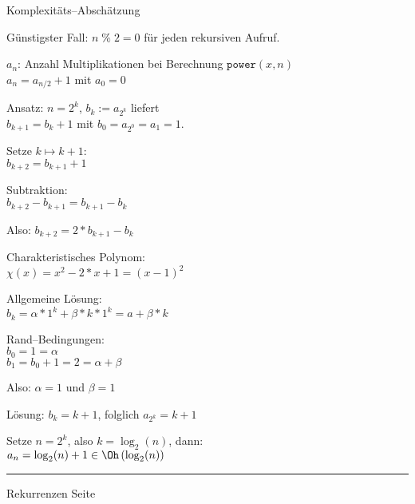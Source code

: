 
\begin{slide}{}
\normalsize

\begin{center}
Komplexit\"ats--Absch\"atzung
\end{center}
\vspace*{0.5cm}

\footnotesize
G\"unstigster Fall:  $n\;\%\;2 = 0$ f\"ur jeden rekursiven Aufruf.

$a_n$: Anzahl Multiplikationen bei Berechnung $\mathtt{power}(x,n)$ \\[0.3cm]
\hspace*{1.3cm} $a_n = a_{n/2} + 1$ \quad mit $a_0 = 0$
 
Ansatz: $n = 2^k$, $b_k := a_{2^k}$ liefert \\[0.3cm]
\hspace*{1.3cm} $b_{k+1} = b_k + 1$ \quad mit $b_0 = a_{2^0} = a_1 = 1$.

Setze $k \mapsto k + 1$: \\[0.3cm]
\hspace*{1.3cm} $b_{k+2} = b_{k+1} + 1$

Subtraktion: \\[0.3cm]
\hspace*{1.3cm} $b_{k+2} - b_{k+1} = b_{k+1} - b_k$ 

Also: $b_{k+2} = 2 * b_{k+1} - b_k$

Charakteristisches Polynom: \\[0.3cm]
\hspace*{1.3cm} $\chi(x) = x^2 - 2 * x + 1 = (x-1)^2$

Allgemeine L\"osung: \\[0.3cm]
\hspace*{1.3cm} $b_k = \alpha * 1^k + \beta * k * 1^k = a + \beta * k$

Rand--Bedingungen: \\[0.3cm]
\hspace*{1.3cm} $b_0 = 1 = \alpha$ \\[0.3cm]
\hspace*{1.3cm} $b_1 = b_0 + 1 = 2 = \alpha + \beta$

Also: $\alpha = 1$ und $\beta = 1$

L\"osung: $b_k = k + 1$, folglich $a_{2^k} = k + 1$

Setze $n = 2^k$, also $k = \log_2(n)$, dann: \\[0.3cm]
\hspace*{1.3cm} $a_n = \log_2(n) + 1 \in \Oh\left(\log_2(n)\right)$



\vspace*{\fill}
\tiny \addtocounter{mypage}{1}
\rule{17cm}{1mm}
Rekurrenzen  \hspace*{\fill} Seite 
\end{slide}

